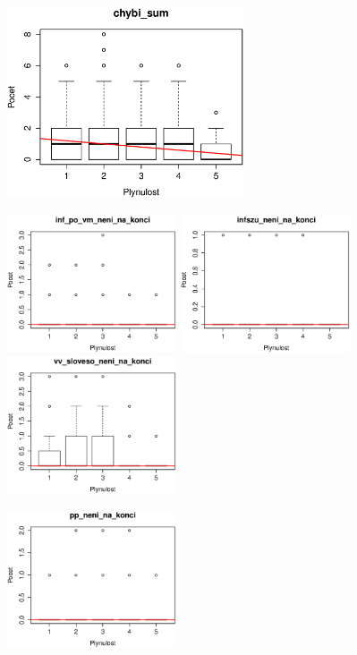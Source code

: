 \documentclass[12pt,a4paper]{report}
\begin{document}
\includegraphics[width=70mm]{./grafy/rysy/chybi_sum.eps}


\includegraphics[width=50mm]{./grafy/rysy/inf_po_vm_neni_na_konci.eps}
\includegraphics[width=50mm]{./grafy/rysy/infszu_neni_na_konci.eps}
\includegraphics[width=50mm]{./grafy/rysy/vv_sloveso_neni_na_konci.eps}

\includegraphics[width=50mm]{./grafy/rysy/pp_neni_na_konci.eps}
\end{document}
